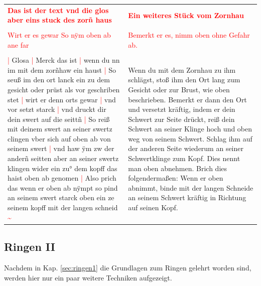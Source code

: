 \begin{longtable}{p{6.25cm}p{6.25cm}}
    \textbf{\textcolor{red}{
        Das ist der text vnd die glos aber eins stuck des zorñ haus}}
    &
    \textbf{\textcolor{red}{
        Ein weiteres Stück vom Zornhau}}
    \\
    \\
    \textcolor{red}{
        Wirt er es gewar So nÿm oben ab ane far}
    &
    \textcolor{red}{
        Bemerkt er es, nimm oben ohne Gefahr ab.}
    \\
    \\
    \textcolor{red}{|} Glosa
    \textcolor{red}{|} Merck das ist
    \textcolor{red}{|} wenn du nn im mit dem zorñhaw ein haust
    \textcolor{red}{|} So seuß im den ort lanck ein zu dem gesicht oder prüst als vor geschriben stet
    \textcolor{red}{|} wirt er denn orts gewar
    \textcolor{red}{|} vnd vor setzt starck
    \textcolor{red}{|} vnd druckt dir dein swert auf die seittñ
    \textcolor{red}{|} So reiß mit deinem swert an seiner swertz clingen vber sich auf oben ab von seinem swert
    \textcolor{red}{|} vnd haw ÿm zw der anderñ seitten aber an seiner swertz klingen wider ein zu° dem kopff das haist oben ab genomen
    \textcolor{red}{|} Also prich das wenn er oben ab nÿmpt so pind an seinem swert starck oben ein ze seinem kopff mit der langen schneid \textcolor{red}{\textasciitilde{}}
    &
    Wenn du mit dem Zornhau zu ihm schlägst, stoß ihm den Ort lang zum Gesicht oder zur Brust, wie oben beschrieben.
    Bemerkt er dann den Ort und versetzt kräftig, indem er dein Schwert zur Seite drückt, reiß dein Schwert an seiner Klinge hoch und oben weg von seinem Schwert.
    Schlag ihm auf der anderen Seite wiederum an seiner Schwertklinge zum Kopf.
    Dies nennt man oben abnehmen.
    Brich dies folgendermaßen: Wenn er oben abnimmt, binde mit der langen Schneide an seinem Schwert kräftig in Richtung auf seinen Kopf.
\end{longtable}

\newpage

\begin{center}
\end{center}

\newpage

\subsection{Ringen II}

Nachdem in Kap. \ref{sec:ringen1} die Grundlagen zum Ringen gelehrt worden sind, werden hier nur ein paar weitere Techniken aufgezeigt.

